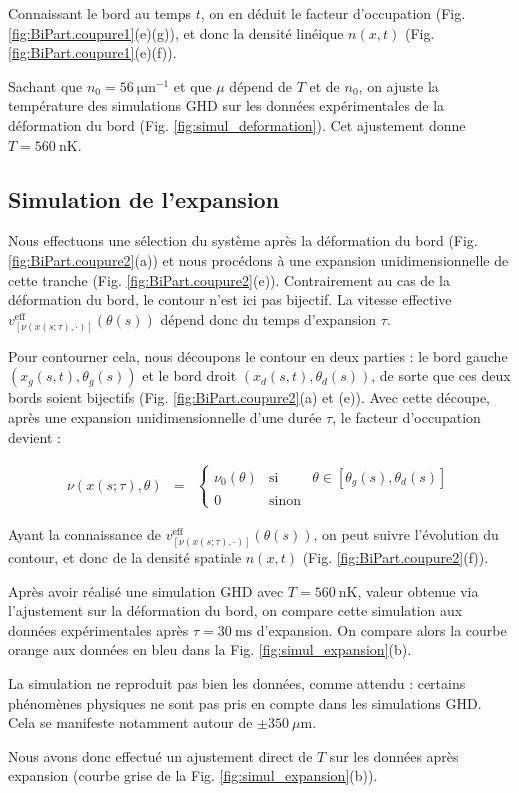 Connaissant le bord au temps $t$, on en déduit le facteur d’occupation (Fig. \ref{fig:BiPart.coupure1}(e)(g)), et donc la densité linéique $n(x,t)$ (Fig. \ref{fig:BiPart.coupure1}(e)(f)).

Sachant que $n_0 = 56~\mathrm{\mu m}^{-1}$ et que $\mu$ dépend de $T$ et de $n_0$, on ajuste la température des simulations GHD sur les données expérimentales de la déformation du bord (Fig. \ref{fig:simul_deformation}). Cet ajustement donne $T = 560~\mathrm{nK}$.

\subsection{Simulation de l’expansion}

Nous effectuons une sélection du système après la déformation du bord (Fig. \ref{fig:BiPart.coupure2}(a)) et nous procédons à une expansion unidimensionnelle de cette tranche (Fig. \ref{fig:BiPart.coupure2}(e)). Contrairement au cas de la déformation du bord, le contour n’est ici pas bijectif. La vitesse effective $v^{\mathrm{eff}}_{[\nu(x(s;\tau),\cdot)]}(\theta(s))$ dépend donc du temps d’expansion $\tau$.

Pour contourner cela, nous découpons le contour en deux parties : le bord gauche $(x_g(s, t), \theta_g(s))$ et le bord droit $(x_d(s, t), \theta_d(s))$, de sorte que ces deux bords soient bijectifs (Fig. \ref{fig:BiPart.coupure2}(a) et (e)). Avec cette découpe, après une expansion unidimensionnelle d’une durée $\tau$, le facteur d’occupation devient :

\begin{eqnarray*}
	\nu ( x(s;\tau), \theta ) & = & 
	\left\{ 
	\begin{array}{rcl}
	\nu_0(\theta) & \mbox{si} & \theta \in [\theta_g(s), \theta_d(s)] \\
	0 & \mbox{sinon} & 
	\end{array} 
	\right.
\end{eqnarray*}

Ayant la connaissance de $v^{\mathrm{eff}}_{[\nu(x(s;\tau),\cdot)]}(\theta(s))$, on peut suivre l’évolution du contour, et donc de la densité spatiale $n(x,t)$ (Fig. \ref{fig:BiPart.coupure2}(f)). 

Après avoir réalisé une simulation GHD avec $T = 560~\mathrm{nK}$, valeur obtenue via l’ajustement sur la déformation du bord, on compare cette simulation aux données expérimentales après $\tau = 30~\mathrm{ms}$ d’expansion. On compare alors la courbe orange aux données en bleu dans la Fig. \ref{fig:simul_expansion}(b). 

La simulation ne reproduit pas bien les données, comme attendu : certains phénomènes physiques ne sont pas pris en compte dans les simulations GHD. Cela se manifeste notamment autour de $\pm 350~\mu\mathrm{m}$. 

Nous avons donc effectué un ajustement direct de $T$ sur les données après expansion (courbe grise de la Fig. \ref{fig:simul_expansion}(b)).

 






